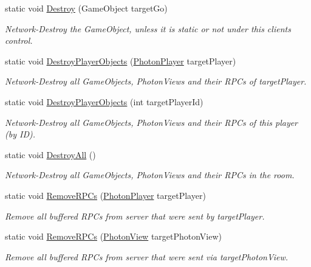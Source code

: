\begin{DoxyCompactItemize}
static void \hyperlink{class_photon_network_abade51a8c3af0e9c280c2817f9ca15e5}{Destroy} (Game\+Object target\+Go)
\begin{DoxyCompactList}\small\item\em Network-\/\+Destroy the Game\+Object, unless it is static or not under this client\textquotesingle{}s control. \end{DoxyCompactList}\item 
static void \hyperlink{class_photon_network_a4c8c84b764c759a16296a1f3ebe48c46}{Destroy\+Player\+Objects} (\hyperlink{class_photon_player}{Photon\+Player} target\+Player)
\begin{DoxyCompactList}\small\item\em Network-\/\+Destroy all Game\+Objects, Photon\+Views and their R\+P\+Cs of target\+Player. \end{DoxyCompactList}\item 
static void \hyperlink{class_photon_network_aa3e39af39baae3611730b914a8fe6f8b}{Destroy\+Player\+Objects} (int target\+Player\+Id)
\begin{DoxyCompactList}\small\item\em Network-\/\+Destroy all Game\+Objects, Photon\+Views and their R\+P\+Cs of this player (by ID). \end{DoxyCompactList}\item 
static void \hyperlink{class_photon_network_a3b52beccf64860705cc467d7abf9fc41}{Destroy\+All} ()
\begin{DoxyCompactList}\small\item\em Network-\/\+Destroy all Game\+Objects, Photon\+Views and their R\+P\+Cs in the room. \end{DoxyCompactList}\item 
static void \hyperlink{class_photon_network_a0b99a01696f62ff29e005e6f939f8dc4}{Remove\+R\+P\+Cs} (\hyperlink{class_photon_player}{Photon\+Player} target\+Player)
\begin{DoxyCompactList}\small\item\em Remove all buffered R\+P\+Cs from server that were sent by target\+Player. \end{DoxyCompactList}\item 
static void \hyperlink{class_photon_network_a808fc6d1770c999fb1f5716abb45451a}{Remove\+R\+P\+Cs} (\hyperlink{class_photon_view}{Photon\+View} target\+Photon\+View)
\begin{DoxyCompactList}\small\item\em Remove all buffered R\+P\+Cs from server that were sent via target\+Photon\+View. \end{DoxyCompactList}\item 

\end{DoxyCompactItemize}
